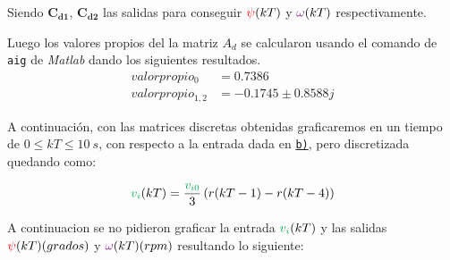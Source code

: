 Siendo $\pmb{C_{d1}} $, $\pmb{C_{d2}} $ las salidas para conseguir $\mathbin{\color{red}\psi}(kT)$ y $\mathbin{\color{violet}\omega}(kT)$ respectivamente.

Luego los valores propios del la matriz $A_d$ se calcularon usando el comando de \texttt{aig} de \textit{Matlab} dando los siguientes resultados.
\begin{align}
  valor propio_{0} &=  0.7386 \\
  valor propio_{1,2} &=  -0.1745 \pm 0.8588j
\end{align}

A continuación, con las matrices discretas obtenidas graficaremos en un tiempo de $0 \leq kT \leq 10\ \unit{s}$, con respecto a la entrada dada en \hyperref[pregunta-b]{\texttt{b)}}, pero discretizada quedando como:

\begin{equation}
  \verd{v_{i}}(kT) = \frac{\verd{v_{i0}}}{3}\left(r(kT-1) - r(kT-4)\right)
\end{equation}

A continuacion se no pidieron graficar la entrada $ \verd{v_{i}}(kT) $ y las salidas $ \mathbin{\color{red}\psi}(kT)(grados) $ y $ \mathbin{\color{violet}\omega}(kT)(rpm) $ resultando lo siguiente:







